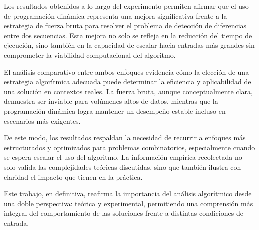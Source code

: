 Los resultados obtenidos a lo largo del experimento permiten afirmar que el uso de programación dinámica representa una mejora significativa frente a la estrategia de fuerza bruta para resolver el problema de detección de diferencias entre dos secuencias. Esta mejora no solo se refleja en la reducción del tiempo de ejecución, sino también en la capacidad de escalar hacia entradas más grandes sin comprometer la viabilidad computacional del algoritmo.

El análisis comparativo entre ambos enfoques evidencia cómo la elección de una estrategia algorítmica adecuada puede determinar la eficiencia y aplicabilidad de una solución en contextos reales. La fuerza bruta, aunque conceptualmente clara, demuestra ser inviable para volúmenes altos de datos, mientras que la programación dinámica logra mantener un desempeño estable incluso en escenarios más exigentes.

De este modo, los resultados respaldan la necesidad de recurrir a enfoques más estructurados y optimizados para problemas combinatorios, especialmente cuando se espera escalar el uso del algoritmo. La información empírica recolectada no solo valida las complejidades teóricas discutidas, sino que también ilustra con claridad el impacto que tienen en la práctica.

Este trabajo, en definitiva, reafirma la importancia del análisis algorítmico desde una doble perspectiva: teórica y experimental, permitiendo una comprensión más integral del comportamiento de las soluciones frente a distintas condiciones de entrada.
